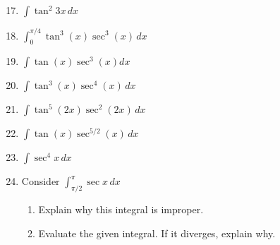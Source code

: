 \documentclass[12pt]{article}
\newif\ifans
\begin{document}
\begin{enumerate}
\setcounter{enumi}{16}

\item $\int \tan^2{3x}\,dx$ 

\ifans{\fbox{$-x+\frac{1}{3}\tan{(3x)}+C$}} \fi

\item $\int_0^{\pi/4} \tan^{3}{(x)}\sec^3{(x)}\,dx$  

\ifans{\fbox{$\frac{2}{15}\left(1+\sqrt{2}\right)$}} \fi

\item $\int \tan{(x)}\sec^3{(x)}dx$ 

\ifans{\fbox{$\frac{1}{3}\sec^3{x}+C$}} \fi

\item $\int \tan^3{(x)}\sec^4{(x)\,}dx$ 

\ifans{\fbox{$\frac{1}{6}\tan^6{x}+\frac{1}{4}\tan^{4}{x}+C$}} \fi

\item $\int \tan^5{(2x)}\sec^2{(2x)}\,dx$ 

\ifans{\fbox{$\frac{1}{12}\tan^6{(2x)}+C$}} \fi

\item $\int \tan{(x)}\sec^{5/2}{(x)}\,dx$ 

\ifans{\fbox{$\frac{2}{5}\sec^{5/2}{x}+C$; Detailed Solution: \textcolor{blue}{\href{http://www.math.drexel.edu/classes/Calculus/resources/Math122HW/Solutions/122_15_Trig_Int_22.pdf}{Here}}}} \fi

\item $\int \sec^{4}{x}\,dx$ 

\ifans{\fbox{$\frac{1}{3}\tan^3{x}+\tan{x}+C$}} \fi

\item Consider $\int_{\pi/2}^\pi \sec{x} \,dx$

\begin{enumerate}

\item Explain why this integral is improper.

\ifans{\fbox{\parbox{1\linewidth}{The integral is improper because $\sec{x}$ has an infinite discontinuity at $x=\frac{\pi}{2}$ which is the lower limit of integration.}}} \fi

\item Evaluate the given integral.  If it diverges, explain why.

\ifans{\fbox{The integral diverges because $\int_{\pi/2}^{\pi} \sec{x} \,dx = -\infty$}} \fi


\end{enumerate}
\end{enumerate}
\end{document}
